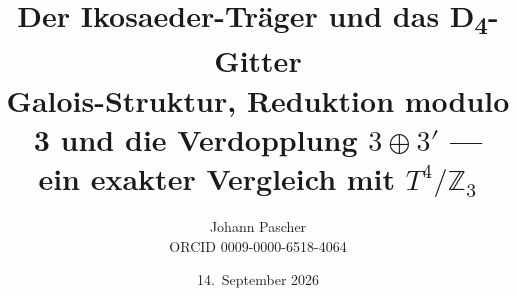 \documentclass[11pt,a4paper]{report}
\title{Der Ikosaeder-Träger und das D\textsubscript{4}-Gitter\\[0.5em]
  \large Galois-Struktur, Reduktion modulo 3 und die Verdopplung $3\oplus3'$ ---\\ ein exakter Vergleich mit $T^4/\mathbb{Z}_3$}
\date{14.~September 2026}
\author{Johann Pascher\\\small ORCID 0009-0000-6518-4064}
\begin{document}
\renewcommand{\thechapter}{}
\renewcommand{\thesection}{\arabic{section}}
\maketitle
\tableofcontents

\end{document}
